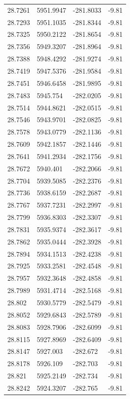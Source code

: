 \begin{table}[H]
\begin{tabular}{llll}
28.7261 & 5951.9947 & -281.8033 & -9.81 \\
28.7293 & 5951.1035 & -281.8344 & -9.81 \\
28.7325 & 5950.2122 & -281.8654 & -9.81 \\
28.7356 & 5949.3207 & -281.8964 & -9.81 \\
28.7388 & 5948.4292 & -281.9274 & -9.81 \\
28.7419 & 5947.5376 & -281.9584 & -9.81 \\
28.7451 & 5946.6458 & -281.9895 & -9.81 \\
28.7483 & 5945.754 & -282.0205 & -9.81 \\
28.7514 & 5944.8621 & -282.0515 & -9.81 \\
28.7546 & 5943.9701 & -282.0825 & -9.81 \\
28.7578 & 5943.0779 & -282.1136 & -9.81 \\
28.7609 & 5942.1857 & -282.1446 & -9.81 \\
28.7641 & 5941.2934 & -282.1756 & -9.81 \\
28.7672 & 5940.401 & -282.2066 & -9.81 \\
28.7704 & 5939.5085 & -282.2376 & -9.81 \\
28.7736 & 5938.6159 & -282.2687 & -9.81 \\
28.7767 & 5937.7231 & -282.2997 & -9.81 \\
28.7799 & 5936.8303 & -282.3307 & -9.81 \\
28.7831 & 5935.9374 & -282.3617 & -9.81 \\
28.7862 & 5935.0444 & -282.3928 & -9.81 \\
28.7894 & 5934.1513 & -282.4238 & -9.81 \\
28.7925 & 5933.2581 & -282.4548 & -9.81 \\
28.7957 & 5932.3648 & -282.4858 & -9.81 \\
28.7989 & 5931.4714 & -282.5168 & -9.81 \\
28.802 & 5930.5779 & -282.5479 & -9.81 \\
28.8052 & 5929.6843 & -282.5789 & -9.81 \\
28.8083 & 5928.7906 & -282.6099 & -9.81 \\
28.8115 & 5927.8969 & -282.6409 & -9.81 \\
28.8147 & 5927.003 & -282.672 & -9.81 \\
28.8178 & 5926.109 & -282.703 & -9.81 \\
28.821 & 5925.2149 & -282.734 & -9.81 \\
28.8242 & 5924.3207 & -282.765 & -9.81 \\

\end{tabular}
\end{table}
